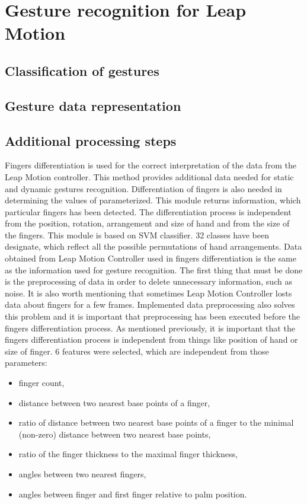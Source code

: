 \chapter{Gesture recognition for Leap Motion}

\section{Classification of gestures}

\section{Gesture data representation}

\section{Additional processing steps}
Fingers differentiation is used for the correct interpretation of the data from the Leap Motion controller. This method provides additional data needed for static and dynamic gestures recognition. Differentiation of fingers is also needed in determining the values of parameterized. This module returns information, which particular fingers has been detected. The differentiation process is independent from the position, rotation, arrangement and size of hand and from the size of the fingers.  This module is based on SVM classifier. 32 classes have been designate, which reflect all the possible permutations of hand arrangements.
Data obtained from Leap Motion Controller used in fingers differentiation is the same as the information used for gesture recognition. The first thing that must be done is the preprocessing of data in order to delete unnecessary information, such as noise. It is also worth mentioning that sometimes Leap Motion Controller losts data about fingers for a few frames. Implemented data preprocessing also solves this problem and it is important that preprocessing has been executed before the fingers differentiation process.
As mentioned previously, it is important that the fingers differentiation process is independent from things like position of hand or size of finger. 6 features were selected, which are independent from those parameters: 

\begin{itemize}
\item finger count, 
\item distance between two nearest base points of a finger, 
\item ratio of distance between two nearest base points of a finger to the minimal (non-zero) distance between two nearest base points, 
\item ratio of the finger thickness to the maximal finger thickness, 
\item angles between two nearest fingers, 
\item angles between finger and first finger relative to palm position. 
\end{itemize}

